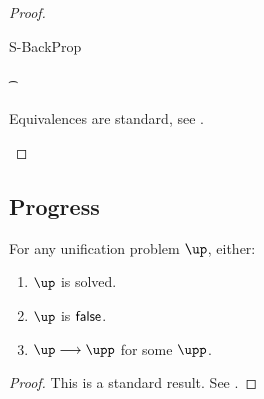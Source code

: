 \documentclass[acmsmall,screen,nonacm,review]{acmart}
\begin{document}
\begin{proof}
\begin{proofcases}
\begin{proofcases}
	    \begin{llproof}
	    \ForallPf{\semenv}{}{}
	    \vdashPf{\semenv\where{\x \is \semenv(\cabsr \tv \tvs \ueqs)}}{\c}{$\x \disjoint \c$}
	    \vdashPf{\semenv}{\cexists {\tv, \tvs} \ueqs}{}
\Hand	    {}
	    \end{llproof}
	\end{proofcases}

  \proofcaserewrite
    {S-BackProp}
    {\C\where
       {\cletr \x \tv \tvs {\Ca\where{\cmatch \tvp \cbrs}}
                           {\Cb\where{\cpapp \x \ren \ueqs \tvc}}} \\
     \tvp \in \dom \ren \\
      {\cunif \t \ueq} \in \C\where\Cb \\
     \x \disjoint \Cb}
    {\C\where{\cletr \x \tv \tvs {\Ca\where{\cmatched \tvp {\shape \t} \cbrs}}
		      {\Cb\where{\cpapp \x \ren \ueqs \tvc}}}}




  \begin{llproof}
    Equivalences are standard, see \citep{Pottier-Remy/emlti}.
  \end{llproof}
  \end{proofcases}
\end{proof}

\subsection{Progress}

\begin{lemma}
  For any unification problem $\up$, either:
  \begin{enumerate}[(\roman*)]
    \item $\up$ is solved.
    \item $\up$ is $\mathsf{false}$.
    \item $\up \unif \upp$ for some $\upp$.
    \end{enumerate}
  \begin{proof}
    This is a standard result. See \citep{Pottier-Rem/emlti}.
  \end{proof}
\end{lemma}
\end{document}
